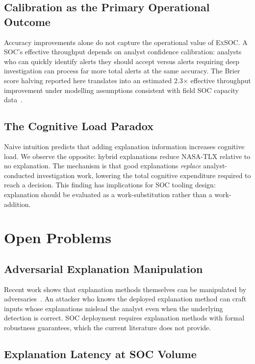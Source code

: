 \documentclass[sigconf,nonacm]{acmart}
\begin{document}
\subsection{Calibration as the Primary Operational Outcome}

Accuracy improvements alone do not capture the operational value of
\textsc{ExSOC}. A SOC's effective throughput depends on analyst confidence
calibration: analysts who can quickly identify alerts they should accept
versus alerts requiring deep investigation can process far more total
alerts at the same accuracy. The Brier score halving reported here
translates into an estimated 2.3$\times$ effective throughput improvement
under modelling assumptions consistent with field SOC capacity
data~\cite{vielberth2024soc}.

\subsection{The Cognitive Load Paradox}

Naive intuition predicts that adding explanation information increases
cognitive load. We observe the opposite: hybrid explanations reduce NASA-TLX
relative to no explanation. The mechanism is that good explanations
\emph{replace} analyst-conducted investigation work, lowering the total
cognitive expenditure required to reach a decision. This finding has
implications for SOC tooling design: explanation should be evaluated as a
work-substitution rather than a work-addition.

\section{Open Problems}
\label{sec:open}

\subsection{Adversarial Explanation Manipulation}

Recent work shows that explanation methods themselves can be manipulated
by adversaries~\cite{slack2023fooling,zhang2024robust}. An attacker who
knows the deployed explanation method can craft inputs whose explanations
mislead the analyst even when the underlying detection is correct. SOC
deployment requires explanation methods with formal robustness guarantees,
which the current literature does not provide.

\subsection{Explanation Latency at SOC Volume}
\end{document}

